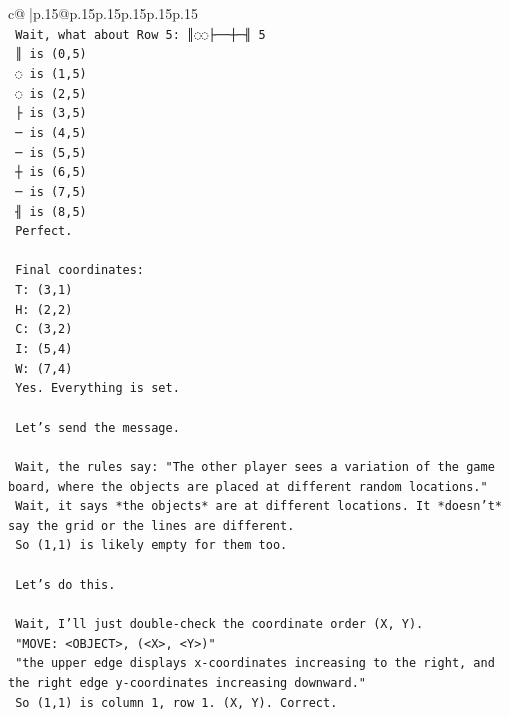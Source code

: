 \documentclass{article}
\begin{document}
{\begin{supertabular}{c@{$\;$}|p{.15\linewidth}@{}p{.15\linewidth}p{.15\linewidth}p{.15\linewidth}p{.15\linewidth}p{.15\linewidth}}
{{{\\ 
\texttt{    Wait, what about Row 5: ║◌◌├──┼─╢ 5} \\
\texttt{    ║ is (0,5)} \\
\texttt{    ◌ is (1,5)} \\
\texttt{    ◌ is (2,5)} \\
\texttt{    ├ is (3,5)} \\
\texttt{    ─ is (4,5)} \\
\texttt{    ─ is (5,5)} \\
\texttt{    ┼ is (6,5)} \\
\texttt{    ─ is (7,5)} \\
\texttt{    ╢ is (8,5)} \\
\texttt{    Perfect.} \\
\\ 
\texttt{    Final coordinates:} \\
\texttt{    T: (3,1)} \\
\texttt{    H: (2,2)} \\
\texttt{    C: (3,2)} \\
\texttt{    I: (5,4)} \\
\texttt{    W: (7,4)} \\
\texttt{    Yes. Everything is set.} \\
\\ 
\texttt{    Let's send the message.} \\
\\ 
\texttt{    Wait, the rules say: "The other player sees a variation of the game board, where the objects are placed at different random locations."} \\
\texttt{    Wait, it says *the objects* are at different locations. It *doesn't* say the grid or the lines are different.} \\
\texttt{    So (1,1) is likely empty for them too.} \\
\\ 
\texttt{    Let's do this.} \\
\\ 
\texttt{    Wait, I'll just double{-}check the coordinate order (X, Y).} \\
\texttt{    "MOVE: <OBJECT>, (<X>, <Y>)"} \\
\texttt{    "the upper edge displays x{-}coordinates increasing to the right, and the right edge y{-}coordinates increasing downward."} \\
\texttt{    So (1,1) is column 1, row 1. (X, Y). Correct.} \\
\\ 
}}}
\end{supertabular}}
\end{document}
